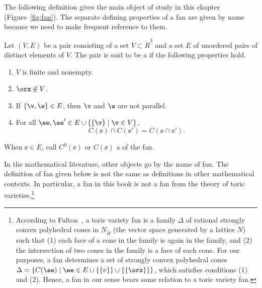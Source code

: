 The following definition gives the main object of study in this
chapter (Figure~\ref{fig:fan}).  The separate defining properties of a
fan are given by name because we need to make frequent reference to
them.

\begin{definition}
Let $(V,E)$ be a pair consisting of a set $V\subset \ring{R}^3$ and
a set $E$ of unordered pairs of distinct elements of $V$.  The pair
is said to be a  if the following properties hold.
\begin{enumerate}
\item {} $V$ is finite and  nonempty.
\item {} $\orz\not\in V$.
\item {} If $\{\v,\w\} \in E$, then $\v$ and $\w$
are not parallel.
\item {}
For all $\ee ,\ee '\in E \cup \{\{\v\}\mid \v\in V\}$, 
\[ C(\ee )\cap C(\ee ') = C(\ee \cap \ee
').\] 
\end{enumerate}
When $\ee\in E$, call $C^0(\ee)$ or $C(\ee)$ a 
of the fan.
\end{definition}
%
%
%

\figIIAHJXI %

\begin{remark}
  In the mathematical literature, other objects go by
  the name of fan.  The definition of fan given below is not the same
  as definitions in other mathematical contexts.  In particular, a fan
  in this book is not a fan from the theory of toric
  varieties.\footnote{According to
    Fulton~\cite{Fulton}, %
    a toric variety fan is a family $\Delta$ of rational strongly
    convex polyhedral cones in $N_{\ring{R}}$ (the vector space
    generated by a lattice $N$) such that (1) each face of a cone in
    the family is again in the family, and (2) the intersection of two
    cones in the family is a face of each cone.  For our purposes, a
    fan determines a set of strongly convex polyhedral cones $\Delta =
    \{ C(\ee)\mid \ee\in E\cup \{ \{v \} \} \cup \{ \{ \orz\} \} \}$,
    which satisfies conditions (1) and (2).  Hence, a fan in our sense
    bears some relation to a toric variety fan.}
\end{remark}




